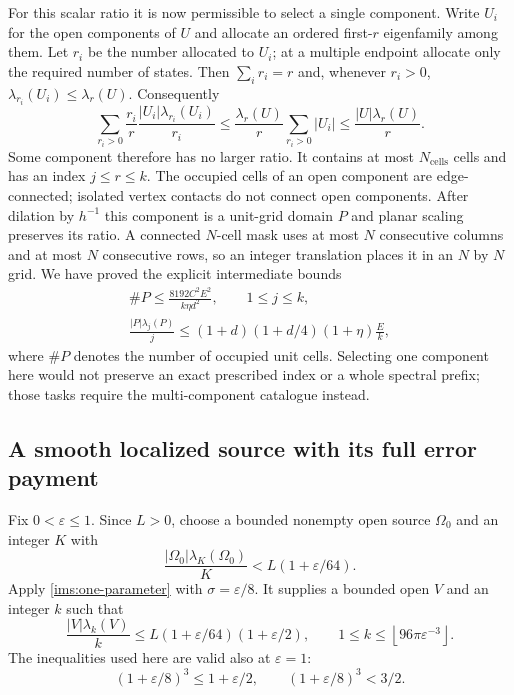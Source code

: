 \documentclass[11pt,reqno]{amsart}
\numberwithin{equation}{section}
\newcommand{\abs}[1]{\lvert#1\rvert}
\newcommand{\Om}{\Omega}
\begin{document}
For this scalar ratio it is now permissible to select a single
component.  Write $U_i$ for the open components of $U$ and allocate
an ordered first-$r$ eigenfamily among them.  Let $r_i$ be the
number allocated to $U_i$; at a multiple endpoint allocate only
the required number of states.  Then $\sum_i r_i=r$ and, whenever
$r_i>0$, $\lambda_{r_i}(U_i)\leq\lambda_r(U)$.  Consequently
\[
 \sum_{r_i>0}\frac{r_i}{r}
       \frac{\abs{U_i}\lambda_{r_i}(U_i)}{r_i}
   \leq\frac{\lambda_r(U)}r\sum_{r_i>0}\abs{U_i}
   \leq\frac{\abs U\lambda_r(U)}r.
\]
Some component therefore has no larger ratio.  It contains at most
$N_{\mathrm{cells}}$ cells and has an index $j\leq r\leq k$.
The occupied cells of an open component are edge-connected;
isolated vertex contacts do not connect open components.
After dilation by $h^{-1}$ this component is a unit-grid domain
$P$ and planar scaling preserves its ratio.  A connected $N$-cell
mask uses at most $N$ consecutive columns and at most $N$
consecutive rows, so an integer translation places it in an
$N$ by $N$ grid.  We have proved the explicit intermediate bounds
\begin{equation}
 \begin{gathered}
 \#P\leq\frac{8192C^2E^2}{k\eta d^2},\qquad
 1\leq j\leq k,\\
 \frac{\abs P\lambda_j(P)}j
   \leq(1+d)(1+d/4)(1+\eta)\frac Ek,
 \end{gathered}
 \label{global:connected-trace-output}
\end{equation}
where $\#P$ denotes the number of occupied unit cells.
Selecting one component here would not preserve an exact prescribed
index or a whole spectral prefix; those tasks require the
multi-component catalogue instead.

\subsection{A smooth localized source with its full error payment}
\label{global:smooth-source-section}

Fix $0<\varepsilon\leq1$.  Since $L>0$, choose a bounded nonempty
open source $\Om_0$ and an integer $K$ with
\[
 \frac{\abs{\Om_0}\lambda_K(\Om_0)}K
      <L(1+\varepsilon/64).
\]
Apply \eqref{ims:one-parameter} with $\sigma=\varepsilon/8$.
It supplies a bounded open $V$ and an integer $k$ such that
\begin{equation}
 \frac{\abs V\lambda_k(V)}k
   \leq L(1+\varepsilon/64)(1+\varepsilon/2),\qquad
 1\leq k\leq\left\lfloor96\pi\varepsilon^{-3}\right\rfloor.
 \label{global:localized-source}
\end{equation}
The inequalities used here are valid also at $\varepsilon=1$:
\[
 (1+\varepsilon/8)^3\leq1+\varepsilon/2,
 \qquad (1+\varepsilon/8)^3<3/2.
\]
\end{document}
